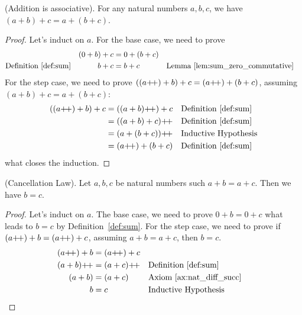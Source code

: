 \begin{proposition}
    \textup{(Addition is associative).} For any natural numbers $a, b, c$, we have $(a+b)+c=a+(b+c)$.\label{prop:sum_associative}
\end{proposition}
\begin{proof}
    Let's induct on $a$. For the base case, we need to prove 
    \begin{align*}
        &&(0+b)+c&=0+(b+c)\\
        \text{Definition~\ref{def:sum}}&&b+c&=b+c&&\text{Lemma~\ref{lem:sum_zero_commutative}}
    \end{align*}
    For the step case, we need to prove $((a\operatorname{\!+\!+})+b)+c=(a\operatorname{\!+\!+})+(b+c)$, assuming $(a+b)+c=a+(b+c)$:
    \begin{align*}
        ((a\next)+b)+c&=((a+b)\next) + c && \text{Definition~\ref{def:sum}}\\
        &=((a+b)+c)\next &&\text{Definition~\ref{def:sum}}\\
        &=(a+(b+c))\next &&\text{Inductive Hypothesis}\\
        &=(a\next)+(b+c) &&\text{Definition~\ref{def:sum}}
    \end{align*}
    what closes the induction.
\end{proof}

\begin{proposition}
    \textup{(Cancellation Law).} Let $a, b, c$ be natural numbers such $a+b=a+c$. Then we have $b=c$.\label{prop:cancel_law}
\end{proposition}
\begin{proof}
    Let's induct on $a$. The base case, we need to prove $0+b=0+c$ what leads to $b=c$ by Definition~\ref{def:sum}. For the step case, 
    we need to prove if $(a\operatorname{\!+\!+})+b=(a\operatorname{\!+\!+})+c$, assuming $a+b=a+c$, then $b=c$.
    \begin{align*}
        (a\next)+b&=(a\next)+c\\
        (a+b)\next&=(a+c)\next &&\text{Definition~\ref{def:sum}}\\
        (a+b)&=(a+c) && \text{Axiom~\ref{ax:nat_diff_succ}}\\
        b&=c&&\text{Inductive Hypothesis}
    \end{align*}
\end{proof}

